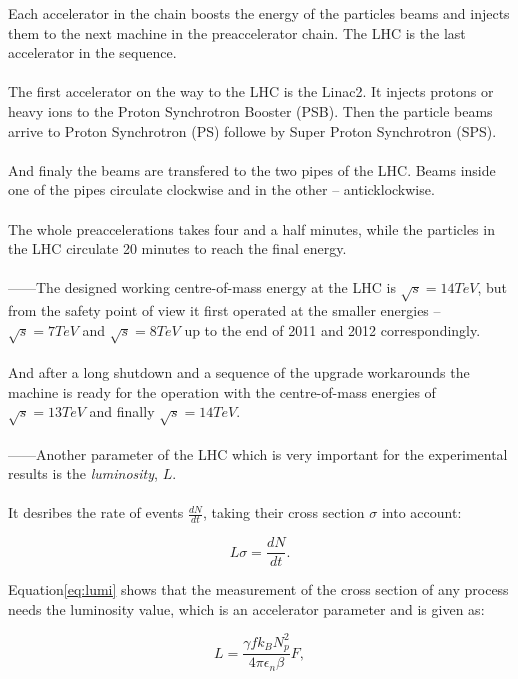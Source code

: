 Each accelerator in the chain boosts the energy of the particles beams and injects them to the next machine in
the preaccelerator chain. The LHC is the last accelerator in the sequence.
\\
\\
The first accelerator on the way to the LHC is the Linac2. It injects protons or heavy ions to the Proton Synchrotron
Booster (PSB). Then the particle beams arrive to Proton Synchrotron (PS) followe by Super Proton Synchrotron (SPS).
\\
\\
And finaly the beams are transfered to the two pipes of the LHC. Beams inside one of the pipes circulate clockwise
and in the other -- anticklockwise. 
\\
\\
The whole preaccelerations takes four and a half minutes, while the particles in the LHC circulate 20 minutes
to reach the final energy.
\\
\\
------The designed working centre-of-mass energy at the LHC is $\sqrt{s} = 14 TeV$, but from the safety
point of view it first operated at the smaller energies -- $\sqrt{s} = 7 TeV$ and $\sqrt{s} = 8 TeV$ up to
the end of 2011 and 2012 correspondingly.
\\
\\
And after a long shutdown and a sequence of the upgrade workarounds the machine is ready for the operation
with the centre-of-mass energies of $\sqrt{s} = 13 TeV$ and finally $\sqrt{s} = 14 TeV$. 
\\
\\
------Another parameter of the LHC which is very important for the experimental results is the \textit{luminosity}, $L$.
\\
\\
It desribes the rate of events $\frac{dN}{dt}$, taking their cross section $\sigma$ into account:

\begin{equation}\label{eq:lumi}
  L \sigma = \frac{dN}{dt}.
\end{equation}

Equation\ref{eq:lumi} shows that the measurement of the cross section of any process needs the luminosity 
value, which is an accelerator parameter and is given as\cite{CMStdr}:

\begin{equation}
 L = \frac{\gamma f k_{B} N_{p}^2}{4 \pi \epsilon_{n} \beta} F,
\end{equation}

